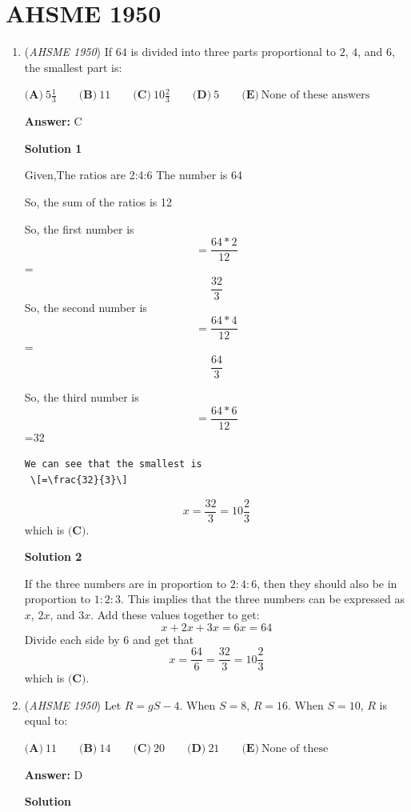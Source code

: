 \section{AHSME 1950}
        \begin{enumerate}
        	\item (\textit{AHSME 1950}) If $64$ is divided into three parts proportional to $2$, $4$, and $6$, the smallest part is:


 $\textbf{(A)}\ 5\frac{1}{3}\qquad\textbf{(B)}\ 11\qquad\textbf{(C)}\ 10\frac{2}{3}\qquad\textbf{(D)}\ 5\qquad\textbf{(E)}\ \text{None of these answers}$

 \textbf{Answer: }C



\textbf{Solution 1}

Given,The ratios are 2:4:6 The number is 64

 So, the sum of the ratios is 12 

 So, the first number is  
 \[=\frac{64*2}{12}\]=
 \[\frac{32}{3}\] So, the second number is 
 \[=\frac{64*4}{12}\]=
 \[\frac{64}{3}\] 

 So, the third number is
 \[=\frac{64*6}{12}\]=32

 \begin{verbatim}
We can see that the smallest is
 \[=\frac{32}{3}\]
\end{verbatim}


 \[x=\frac{32}{3}=10 \frac{2}{3}\]which is $\boxed{\textbf{(C)}}$.

 



\textbf{Solution 2}

If the three numbers are in proportion to $2:4:6$, then they should also be in proportion to $1:2:3$. This implies that the three numbers can be expressed as $x$, $2x$, and $3x$. Add these values together to get:
 \[x+2x+3x=6x=64\]Divide each side by 6 and get that 
 \[x=\frac{64}{6}=\frac{32}{3}=10 \frac{2}{3}\]which is $\boxed{\textbf{(C)}}$.

 


	\item (\textit{AHSME 1950}) Let $R=gS-4$. When $S=8$, $R=16$. When $S=10$, $R$ is equal to:


 $\textbf{(A)}\ 11\qquad\textbf{(B)}\ 14\qquad\textbf{(C)}\ 20\qquad\textbf{(D)}\ 21\qquad\textbf{(E)}\ \text{None of these}$

 \textbf{Answer: }D



\textbf{Solution}


\end{enumerate}
